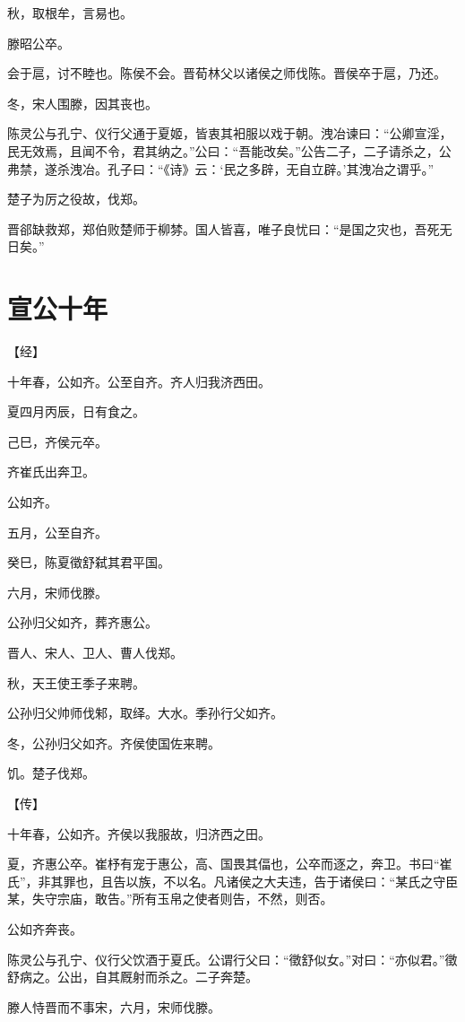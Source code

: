 \documentclass[a4paper,12pt,UTF8,twoside]{ctexbook}
\begin{document}
秋，取根牟，言易也。

滕昭公卒。

会于扈，讨不睦也。陈侯不会。晋荀林父以诸侯之师伐陈。晋侯卒于扈，乃还。

冬，宋人围滕，因其丧也。

陈灵公与孔宁、仪行父通于夏姬，皆衷其衵服以戏于朝。洩冶谏曰：“公卿宣淫，民无效焉，且闻不令，君其纳之。”公曰：“吾能改矣。”公告二子，二子请杀之，公弗禁，遂杀洩冶。孔子曰：“《诗》云：‘民之多辟，无自立辟。’其洩冶之谓乎。”

楚子为厉之役故，伐郑。

晋郤缺救郑，郑伯败楚师于柳棼。国人皆喜，唯子良忧曰：“是国之灾也，吾死无日矣。”


\section{宣公十年}



【经】

十年春，公如齐。公至自齐。齐人归我济西田。

夏四月丙辰，日有食之。

己巳，齐侯元卒。

齐崔氏出奔卫。

公如齐。

五月，公至自齐。

癸巳，陈夏徵舒弑其君平国。

六月，宋师伐滕。

公孙归父如齐，葬齐惠公。

晋人、宋人、卫人、曹人伐郑。

秋，天王使王季子来聘。

公孙归父帅师伐邾，取绎。大水。季孙行父如齐。

冬，公孙归父如齐。齐侯使国佐来聘。

饥。楚子伐郑。

【传】

十年春，公如齐。齐侯以我服故，归济西之田。

夏，齐惠公卒。崔杼有宠于惠公，高、国畏其偪也，公卒而逐之，奔卫。书曰“崔氏”，非其罪也，且告以族，不以名。凡诸侯之大夫违，告于诸侯曰：“某氏之守臣某，失守宗庙，敢告。”所有玉帛之使者则告，不然，则否。

公如齐奔丧。

陈灵公与孔宁、仪行父饮酒于夏氏。公谓行父曰：“徵舒似女。”对曰：“亦似君。”徵舒病之。公出，自其厩射而杀之。二子奔楚。

滕人恃晋而不事宋，六月，宋师伐滕。
\end{document}
